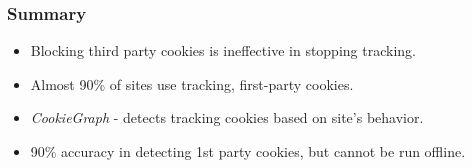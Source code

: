 \documentclass{beamer}
\begin{document}
\begin{frame}
\frametitle{Summary}

\begin{itemize}
\item Blocking third party cookies is ineffective in stopping tracking.
\item Almost 90\% of sites use tracking, first-party cookies.
\item \textit{CookieGraph} - detects tracking cookies based on site's behavior.
\item 90\% accuracy in detecting 1st party cookies, but cannot be run offline.
\end{itemize}

\end{frame}
\end{document}

